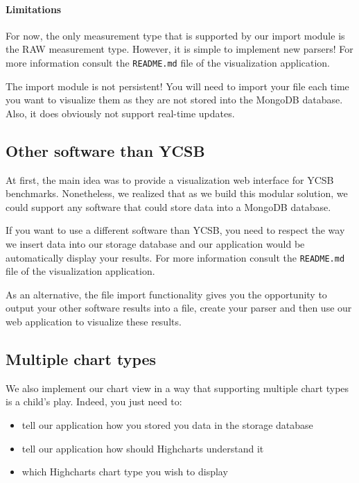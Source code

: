 \documentclass[a4paper,11pt]{report}
\begin{document}
\paragraph{Limitations}

For now, the only measurement type that is supported by our import module is the RAW measurement type. However, it is simple to implement new parsers! For more information consult the \texttt{README.md} file of the visualization application.

The import module is not persistent! You will need to import your file each time you want to visualize them as they are not stored into the MongoDB database.
Also, it does obviously not support real-time updates.

\subsection{Other software than YCSB}

At first, the main idea was to provide a visualization web interface for YCSB benchmarks. Nonetheless, we realized that as we build this modular solution, we could support any software that could store data into a MongoDB database.

If you want to use a different software than YCSB, you need to respect the way we insert data into our storage database and our application would be automatically display your results. For more information consult the \texttt{README.md} file of the visualization application.

As an alternative, the file import functionality gives you the opportunity to output your other software results into a file, create your parser and then use our web application to visualize these results.

\subsection{Multiple chart types}

We also implement our chart view in a way that supporting multiple chart types is a child's play. Indeed, you just need to:

\begin{itemize}
\item
tell our application how you stored you data in the storage database
\item
tell our application how should Highcharts understand it
\item
which Highcharts chart type you wish to display
\end{itemize}
\end{document}
